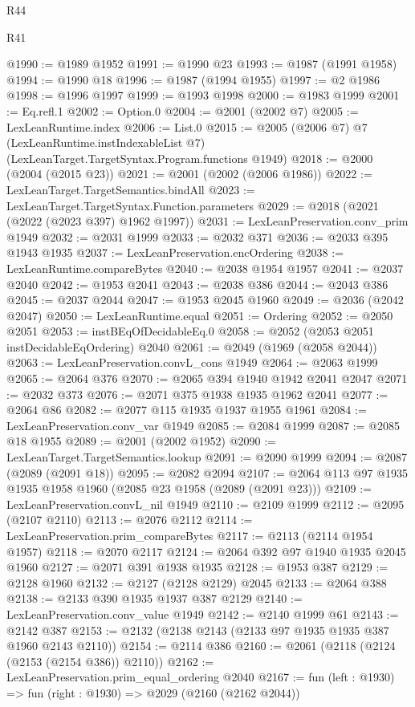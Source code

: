 \begin{lexlean}{R44}
\begin{lexlean}{R41}
\begin{coremodule}
{{{{{{{{{{{{{{{{{{{{{{{{{{{{{{{{{{{{{{{{{{{{{{{{{{{{{{{{{{{{{{{{{{{{{{{{{{{{{{{{{{{{{{{@1990 := @1989 @1952
@1991 := @1990 @23
@1993 := @1987 (@1991 @1958)
@1994 := @1990 @18
@1996 := @1987 (@1994 @1955)
@1997 := @2 @1986
@1998 := @1996 @1997
@1999 := @1993 @1998
@2000 := @1983 @1999
@2001 := Eq.refl.{1}
@2002 := Option.{0}
@2004 := @2001 (@2002 @7)
@2005 := LexLeanRuntime.index
@2006 := List.{0}
@2015 := @2005
    (@2006 @7)
    @7
    (LexLeanRuntime.instIndexableList @7)
    (LexLeanTarget.TargetSyntax.Program.functions @1949)
@2018 := @2000 (@2004 (@2015 @23))
@2021 := @2001 (@2002 (@2006 @1986))
@2022 := LexLeanTarget.TargetSemantics.bindAll
@2023 := LexLeanTarget.TargetSyntax.Function.parameters
@2029 := @2018 (@2021 (@2022 (@2023 @397) @1962 @1997))
@2031 := LexLeanPreservation.conv_prim @1949
@2032 := @2031 @1999
@2033 := @2032 @371
@2036 := @2033 @395 @1943 @1935
@2037 := LexLeanPreservation.encOrdering
@2038 := LexLeanRuntime.compareBytes
@2040 := @2038 @1954 @1957
@2041 := @2037 @2040
@2042 := @1953 @2041
@2043 := @2038 @386
@2044 := @2043 @386
@2045 := @2037 @2044
@2047 := @1953 @2045 @1960
@2049 := @2036 (@2042 @2047)
@2050 := LexLeanRuntime.equal
@2051 := Ordering
@2052 := @2050 @2051
@2053 := instBEqOfDecidableEq.{0}
@2058 := @2052 (@2053 @2051 instDecidableEqOrdering) @2040
@2061 := @2049 (@1969 (@2058 @2044))
@2063 := LexLeanPreservation.convL_cons @1949
@2064 := @2063 @1999
@2065 := @2064 @376
@2070 := @2065 @394 @1940 @1942 @2041 @2047
@2071 := @2032 @373
@2076 := @2071 @375 @1938 @1935 @1962 @2041
@2077 := @2064 @86
@2082 := @2077 @115 @1935 @1937 @1955 @1961
@2084 := LexLeanPreservation.conv_var @1949
@2085 := @2084 @1999
@2087 := @2085 @18 @1955
@2089 := @2001 (@2002 @1952)
@2090 := LexLeanTarget.TargetSemantics.lookup
@2091 := @2090 @1999
@2094 := @2087 (@2089 (@2091 @18))
@2095 := @2082 @2094
@2107 := @2064 @113 @97 @1935 @1935 @1958 @1960 (@2085 @23 @1958 (@2089 (@2091 @23)))
@2109 := LexLeanPreservation.convL_nil @1949
@2110 := @2109 @1999
@2112 := @2095 (@2107 @2110)
@2113 := @2076 @2112
@2114 := LexLeanPreservation.prim_compareBytes
@2117 := @2113 (@2114 @1954 @1957)
@2118 := @2070 @2117
@2124 := @2064 @392 @97 @1940 @1935 @2045 @1960
@2127 := @2071 @391 @1938 @1935
@2128 := @1953 @387
@2129 := @2128 @1960
@2132 := @2127 (@2128 @2129) @2045
@2133 := @2064 @388
@2138 := @2133 @390 @1935 @1937 @387 @2129
@2140 := LexLeanPreservation.conv_value @1949
@2142 := @2140 @1999 @61
@2143 := @2142 @387
@2153 := @2132 (@2138 @2143 (@2133 @97 @1935 @1935 @387 @1960 @2143 @2110))
@2154 := @2114 @386
@2160 := @2061 (@2118 (@2124 (@2153 (@2154 @386)) @2110))
@2162 := LexLeanPreservation.prim_equal_ordering @2040
@2167 := fun (left : @1930) => fun (right : @1930) => @2029 (@2160 (@2162 @2044))
}}}}}}}}}}}}}}}}}}}}}}}}}}}}}}}}}}}}}}}}}}}}}}}}}}}}}}}}}}}}}}}}}}}}}}}}}}}}}}}}}}}}}}}
\end{coremodule}
\end{lexlean}
\end{lexlean}
